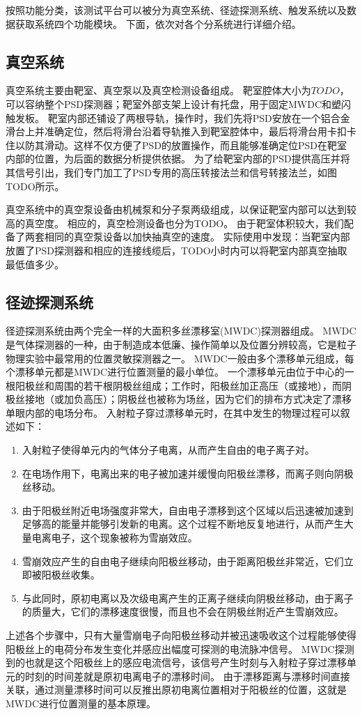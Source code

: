 按照功能分类，该测试平台可以被分为真空系统、径迹探测系统、触发系统以及数据获取系统四个功能模块。
下面，依次对各个分系统进行详细介绍。

\subsection{真空系统}
\label{sec:cosmic_ray:vacuum_system}
真空系统主要由靶室、真空泵以及真空检测设备组成。
靶室腔体大小为$TODO$，可以容纳整个PSD探测器；靶室外部支架上设计有托盘，用于固定MWDC和塑闪触发板。
靶室内部还铺设了两根导轨，操作时，我们先将PSD安放在一个铝合金滑台上并准确定位，然后将滑台沿着导轨推入到靶室腔体中，最后将滑台用卡扣卡住以防其滑动。这样不仅方便了PSD的放置操作，而且能够准确定位PSD在靶室内部的位置，为后面的数据分析提供依据。
为了给靶室内部的PSD提供高压并将其信号引出，我们专门加工了PSD专用的高压转接法兰和信号转接法兰，如图TODO所示。

真空系统中的真空泵设备由机械泵和分子泵两级组成，以保证靶室内部可以达到较高的真空度。
相应的，真空检测设备也分为TODO。
由于靶室体积较大，我们配备了两套相同的真空泵设备以加快抽真空的速度。
实际使用中发现：当靶室内部放置了PSD探测器和相应的连接线缆后，TODO小时内可以将靶室内部真空抽取最低值多少。

\subsection{径迹探测系统}
\label{sec:cosmic_ray:tracking_system}
径迹探测系统由两个完全一样的大面积多丝漂移室(MWDC)探测器组成。
MWDC是气体探测器的一种，由于制造成本低廉、操作简单以及位置分辨较高，它是粒子物理实验中最常用的位置灵敏探测器之一。
MWDC一般由多个漂移单元组成，每个漂移单元都是MWDC进行位置测量的最小单位。
一个漂移单元由位于中心的一根阳极丝和周围的若干根阴极丝组成；工作时，阳极丝加正高压（或接地），而阴极丝接地（或加负高压）；阴极丝也被称为场丝，因为它们的排布方式决定了漂移单眼内部的电场分布。
入射粒子穿过漂移单元时，在其中发生的物理过程可以叙述如下：
\begin{enumerate}
	\item 入射粒子使得单元内的气体分子电离，从而产生自由的电子离子对。
	\item 在电场作用下，电离出来的电子被加速并缓慢向阳极丝漂移，而离子则向阴极丝移动。
	\item 由于阳极丝附近电场强度非常大，自由电子漂移到这个区域以后迅速被加速到足够高的能量并能够引发新的电离。这个过程不断地反复地进行，从而产生大量电离电子，这个现象被称为雪崩效应。
	\item 雪崩效应产生的自由电子继续向阳极丝移动，由于距离阳极丝非常近，它们立即被阳极丝收集。
	\item 与此同时，原初电离以及次级电离产生的正离子继续向阴极丝移动，由于离子的质量大，它们的漂移速度很慢，而且也不会在阴极丝附近产生雪崩效应。
\end{enumerate}
上述各个步骤中，只有大量雪崩电子向阳极丝移动并被迅速吸收这个过程能够使得阳极丝上的电荷分布发生变化并感应出幅度可探测的电流脉冲信号。
MWDC探测到的也就是这个阳极丝上的感应电流信号，该信号产生时刻与入射粒子穿过漂移单元的时刻的时间差就是原初电离电子的漂移时间。
由于漂移距离与漂移时间直接关联，通过测量漂移时间可以反推出原初电离位置相对于阳极丝的位置，这就是MWDC进行位置测量的基本原理。

